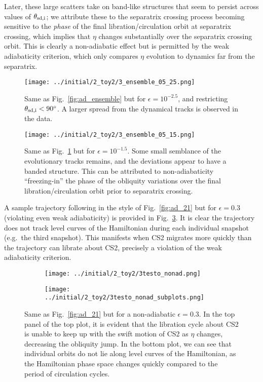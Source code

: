 \documentclass[
        fleqn,
        usenatbib,
        referee,
    ]{mnras}
\begin{document}
Later, these large scatters take on band-like structures that seem to persist
across values of $\theta_{\rm sd, i}$; we attribute these to the separatrix
crossing process becoming sensitive to the \emph{phase} of the final
libration/circulation orbit at separatrix crossing, which implies that $\eta$
changes substantially over the separatrix crossing orbit. This is clearly a
non-adiabatic effect but is permitted by the weak adiabaticity criterion,
which only compares $\eta$ evolution to dynamics far from the separatrix.
\begin{figure}
    \centering
    \texttt{[image: ../initial/2\_toy2/3\_ensemble\_05\_25.png]}
    \caption{Same as Fig.~\ref{fig:ad_ensemble} but for $\epsilon = 10^{-2.5}$,
    and restricting $\theta_{\rm sd, i} < 90^\circ$. A larger spread from the
    dynamical tracks is observed in the data.}\label{fig:3_ensemble_05_25}
\end{figure}
\begin{figure}
    \centering
    \texttt{[image: ../initial/2\_toy2/3\_ensemble\_05\_15.png]}
    \caption{Same as Fig.~\ref{fig:3_ensemble_05_25} but for $\epsilon =
    10^{-1.5}$. Some small semblance of the evolutionary tracks remains, and the
    deviations appear to have a banded structure. This can be attributed to
    non-adiabaticity ``freezing-in'' the phase of the obliquity variations over
    the final libration/circulation orbit prior to separatrix
    crossing.}\label{fig:3_ensemble_05_15}
\end{figure}

A sample trajectory following in the style of Fig.~\ref{fig:ad_21} but for
$\epsilon = 0.3$ (violating even weak adiabaticity) is provided in
Fig.~\ref{fig:nonad_traj}. It is clear the trajectory does not track level curves
of the Hamiltonian during each individual snapshot (e.g.\ the third snapshot).
This manifests when CS2 migrates more quickly than the trajectory can librate
about CS2, precisely a violation of the weak adiabaticity criterion.
\begin{figure}
    \centering
    \begin{subfigure}{\columnwidth}
        \centering
        \texttt{[image: ../initial/2\_toy2/3testo\_nonad.png]}
    \end{subfigure}
    \begin{subfigure}{\columnwidth}
        \centering
        \texttt{[image: ../initial/2\_toy2/3testo\_nonad\_subplots.png]}
    \end{subfigure}
    \caption{Same as Fig.~\ref{fig:ad_21} but for a non-adiabatic $\epsilon =
    0.3$. In the top panel of the top plot, it is evident that the libration
    cycle about CS2 is unable to keep up with the swift motion of CS2 as $\eta$
    changes, decreasing the obliquity jump. In the bottom plot, we can see that
    individual orbits do not lie along level curves of the Hamiltonian, as the
    Hamiltonian phase space changes quickly compared to the period of
    circulation cycles.}\label{fig:nonad_traj}
\end{figure}
\end{document}
